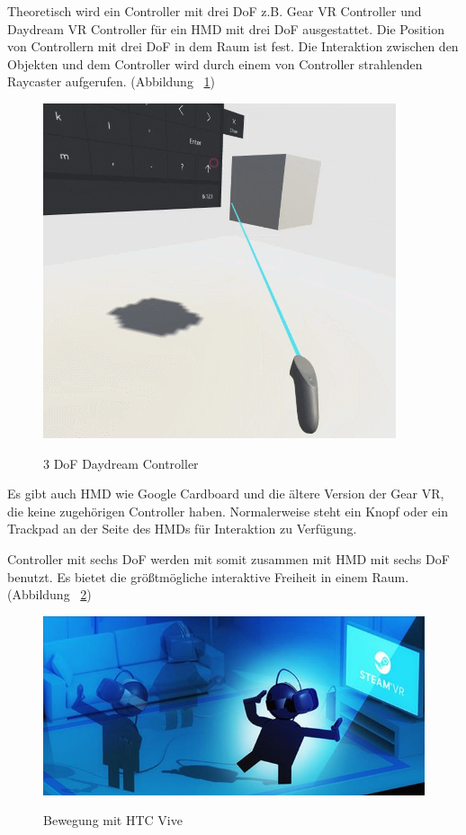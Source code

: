   Theoretisch wird ein Controller mit drei DoF z.B. Gear VR Controller und Daydream VR Controller für ein HMD mit drei DoF ausgestattet. Die Position von Controllern mit drei DoF in dem Raum ist fest. Die Interaktion zwischen den Objekten und dem Controller wird durch einem von Controller strahlenden Raycaster aufgerufen. (Abbildung ~\ref{fig:3dcontroller})

\begin{figure}[ht]
\vspace*{1em}
\centering
\caption{3 DoF Daydream Controller}
\includegraphics[width=\textwidth]{images/3dcontroller.png}
\label{fig:3dcontroller} 
\end{figure}

  Es gibt auch HMD wie Google Cardboard und die ältere Version der Gear VR, die keine zugehörigen Controller haben. Normalerweise steht ein Knopf oder ein Trackpad an der Seite des HMDs für Interaktion zu Verfügung.
  
  Controller mit sechs DoF werden mit somit zusammen mit HMD mit sechs DoF benutzt. Es bietet die größtmögliche interaktive Freiheit in einem Raum. (Abbildung ~\ref{fig:6dcontroller})
  
\begin{figure}[ht]
\vspace*{1em}
\centering
\caption{Bewegung mit HTC Vive}
\includegraphics[width=\textwidth]{images/6dcontroller.jpg}
\label{fig:6dcontroller} 
\end{figure}

